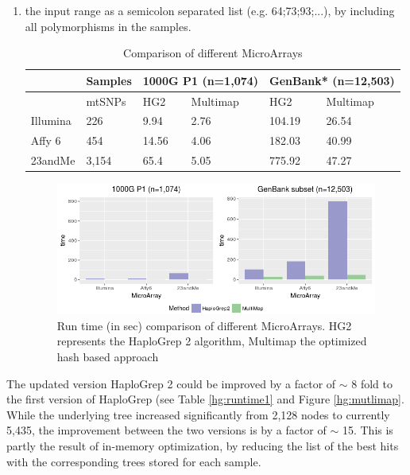 \begin{enumerate}[label=(\alph*)]
\item  the input range as a semicolon separated list (e.g. 64;73;93;...), by including all polymorphisms in the samples. 

\begin{table}[H]
\centering
\caption{Comparison of different MicroArrays}
\label{hg:}
\begin{tabular}{ll|l|l|l|l|}
\cline{3-6}
                               & Samples & \multicolumn{2}{l|}{1000G P1 (n=1,074)} & \multicolumn{2}{l|}{GenBank* (n=12,503)} \\ \hline
\multicolumn{1}{|l|}{}         & mtSNPs  & HG2               & Multimap            & HG2              & Multimap           \\ \hline
\multicolumn{1}{|l|}{Illumina} & 226     & 9.94              & 2.76                & 104.19           & 26.54              \\ \hline
\multicolumn{1}{|l|}{Affy 6}   & 454     & 14.56             & 4.06                & 182.03           & 40.99              \\ \hline
\multicolumn{1}{|l|}{23andMe}  & 3,154   & 65.4              & 5.05                & 775.92           &       47.27             \\ \hline
\end{tabular}
\end{table}
\begin{figure}[!ht]
    \centering
    \includegraphics[width=1\textwidth]{images/multimap2.png}
    \caption[Run time (in sec) comparison of HaploGrep versions]{Run time (in sec) comparison of different MicroArrays. HG2 represents the HaploGrep 2 algorithm, Multimap the optimized hash based approach} 
    \label{hg:multimap2}
\end{figure}
\end{enumerate}

The updated version HaploGrep 2 could be improved by a factor of $\sim$ 8 fold to the first version of HaploGrep (see Table \ref{hg:runtime1} and Figure \ref{hg:mutlimap}. While the underlying tree increased significantly from 2,128 nodes to currently 5,435, the improvement between the two versions is by a factor of $\sim$ 15. This is partly the result of in-memory optimization, by reducing the list of the best hits with the corresponding trees stored for each sample. 

